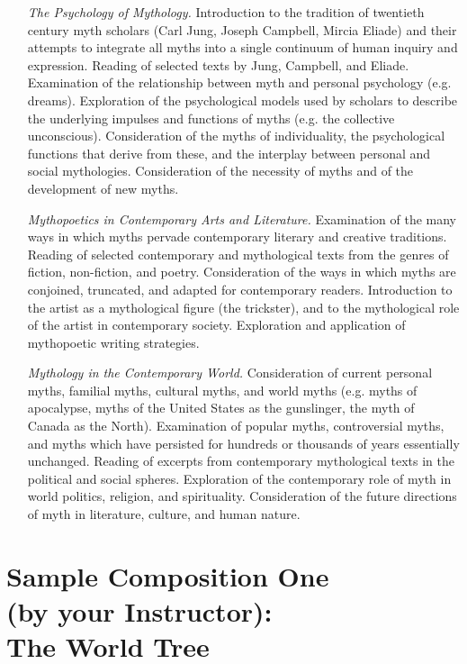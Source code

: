 \documentclass[10pt,DIV09,letterpaper,oneside,headsepline]{scrreprt}
\begin{document}
\begin{itemize}
\item [\textit{The Psychology of Mythology.}] Introduction to the tradition of twentieth century myth scholars (Carl Jung, Joseph Campbell, Mircia Eliade) and their attempts to integrate all myths into a single continuum of human inquiry and expression. Reading of selected texts by Jung, Campbell, and Eliade. Examination of the relationship between myth and personal psychology (e.g. dreams). Exploration of the psychological models used by scholars to describe the underlying impulses and functions of myths (e.g. the collective unconscious). Consideration of the myths of individuality, the psychological functions that derive from these, and the interplay between personal and social mythologies. Consideration of the necessity of myths and of the development of new myths.

\item [\textit{Mythopoetics in Contemporary Arts and Literature.}] Examination of the many ways in which myths pervade contemporary literary and creative traditions. Reading of selected contemporary and mythological texts from the genres of fiction, non-fiction, and poetry. Consideration of the ways in which myths are conjoined, truncated, and adapted for contemporary readers. Introduction to the artist as a mythological figure (the trickster), and to the mythological role of the artist in contemporary society. Exploration and application of mythopoetic writing strategies.

\item [\textit{Mythology in the Contemporary World.}] Consideration of current personal myths, familial myths, cultural myths, and world myths (e.g. myths of apocalypse, myths of the United States as the gunslinger, the myth of Canada as the North). Examination of popular myths, controversial myths, and myths which have persisted for hundreds or thousands of years essentially unchanged. Reading of excerpts from contemporary mythological texts in the political and social spheres. Exploration of the contemporary role of myth in world politics, religion, and spirituality. Consideration of the future directions of myth in literature, culture, and human nature.

\end{itemize}
\newpage

\section{Sample Composition One\\ (by your Instructor):\\ The World Tree}
\end{document}
